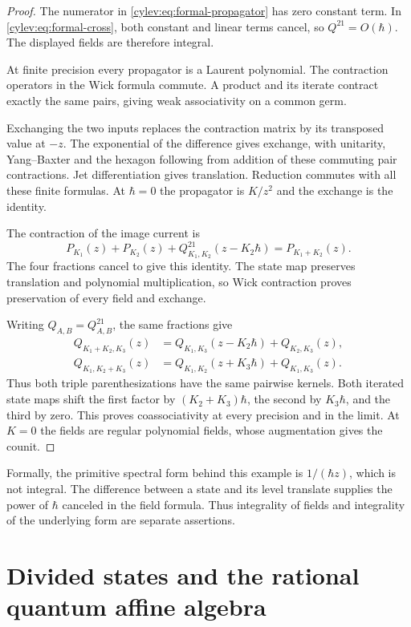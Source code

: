 \begin{proof}
The numerator in \eqref{cylev:eq:formal-propagator} has zero constant
term. In \eqref{cylev:eq:formal-cross}, both constant and linear terms
cancel, so $Q^{21}=O(\hbar)$.
The displayed fields are therefore integral.

At finite precision every propagator is a Laurent polynomial.
The contraction operators in the Wick formula commute.
A product and its iterate contract exactly the same pairs, giving
weak associativity on a common germ.

Exchanging the two inputs replaces the contraction matrix by its
transposed value at $-z$. The exponential of the difference gives
exchange, with unitarity, Yang--Baxter and the hexagon following
from addition of these commuting pair contractions.
Jet differentiation gives translation.
Reduction commutes with all these finite formulas.
At $\hbar=0$ the propagator is $K/z^2$ and the exchange is the identity.

The contraction of the image current is
\[
 P_{K_1}(z)+P_{K_2}(z)+Q_{K_1,K_2}^{21}(z-K_2\hbar)
       =P_{K_1+K_2}(z).
\]
The four fractions cancel to give this identity.
The state map preserves translation and polynomial multiplication,
so Wick contraction proves preservation of every field and exchange.

Writing $Q_{A,B}=Q_{A,B}^{21}$, the same fractions give
\begin{align*}
 Q_{K_1+K_2,K_3}(z)
   &=Q_{K_1,K_3}(z-K_2\hbar)+Q_{K_2,K_3}(z),\\
 Q_{K_1,K_2+K_3}(z)
   &=Q_{K_1,K_2}(z+K_3\hbar)+Q_{K_1,K_3}(z).
\end{align*}
Thus both triple parenthesizations have the same pairwise kernels.
Both iterated state maps shift the first factor by
$(K_2+K_3)\hbar$, the second by $K_3\hbar$, and the third by zero.
This proves coassociativity at every precision and in the limit.
At $K=0$ the fields are regular polynomial fields, whose augmentation
gives the counit.
\end{proof}

Formally, the primitive spectral form behind this example is
$1/(\hbar z)$, which is not integral.
The difference between a state and its level translate supplies the
power of $\hbar$ canceled in the field formula.
Thus integrality of fields and integrality of the underlying form
are separate assertions.

\section{Divided states and the rational quantum affine algebra}

